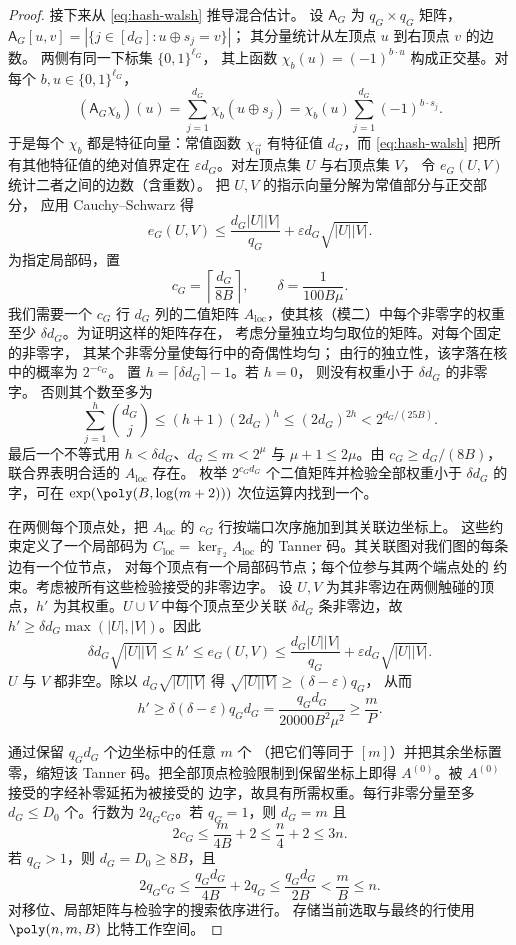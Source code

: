 \begin{proof}
接下来从 \eqref{eq:hash-walsh} 推导混合估计。
设 $\mathsf A_G$ 为 $q_G\times q_G$ 矩阵，
$\mathsf A_G[u,v]=|\{j\in[d_G]:u\oplus s_j=v\}|$；
其分量统计从左顶点 $u$ 到右顶点 $v$ 的边数。
两侧有同一下标集 $\{0,1\}^{\ell_G}$，
其上函数 $\chi_b(u)=(-1)^{b\cdot u}$
构成正交基。对每个 $b,u\in\{0,1\}^{\ell_G}$，
\[
 (\mathsf A_G\chi_b)(u)
 =\sum_{j=1}^{d_G}\chi_b(u\oplus s_j)
 =\chi_b(u)\sum_{j=1}^{d_G}(-1)^{b\cdot s_j}.
\]
于是每个 $\chi_b$ 都是特征向量：常值函数
$\chi_{\vec{0}}$ 有特征值 $d_G$，而
\eqref{eq:hash-walsh} 把所有其他特征值的绝对值界定在
$\varepsilon d_G$。对左顶点集 $U$ 与右顶点集 $V$，
令 $e_G(U,V)$ 统计二者之间的边数（含重数）。
把 $U,V$ 的指示向量分解为常值部分与正交部分，
应用 Cauchy--Schwarz 得
\begin{equation}\label{eq:hash-mixing}
 e_G(U,V)\le
 \frac{d_G|U||V|}{q_G}
 +\varepsilon d_G\sqrt{|U||V|}.
\end{equation}
为指定局部码，置
\[
 c_G=\left\lceil\frac{d_G}{8B}\right\rceil,
 \qquad \delta=\frac1{100B\mu}.
\]
我们需要一个 $c_G$ 行 $d_G$ 列的二值矩阵
$A_{\mathrm{loc}}$，使其核（模二）中每个非零字的权重
至少 $\delta d_G$。为证明这样的矩阵存在，
考虑分量独立均匀取位的矩阵。对每个固定的非零字，
其某个非零分量使每行中的奇偶性均匀；
由行的独立性，该字落在核中的概率为 $2^{-c_G}$。
置 $h=\lceil\delta d_G\rceil-1$。若 $h=0$，
则没有权重小于 $\delta d_G$ 的非零字。
否则其个数至多为
\[
 \sum_{j=1}^{h}\binom{d_G}{j}
 \le(h+1)(2d_G)^h
 \le(2d_G)^{2h}
 <2^{d_G/(25B)}.
\]
最后一个不等式用 $h<\delta d_G$、$d_G\le m<2^\mu$
与 $\mu+1\le2\mu$。由 $c_G\ge d_G/(8B)$，
联合界表明合适的 $A_{\mathrm{loc}}$ 存在。
枚举 $2^{c_Gd_G}$ 个二值矩阵并检验全部权重小于
$\delta d_G$ 的字，可在 $\exp(\poly(B,\log(m+2)))$
次位运算内找到一个。

在两侧每个顶点处，把 $A_{\mathrm{loc}}$ 的 $c_G$
行按端口次序施加到其关联边坐标上。
这些约束定义了一个局部码为
$C_{\mathrm{loc}}=\ker_{\mathbb F_2}A_{\mathrm{loc}}$
的 Tanner 码。其关联图对我们图的每条边有一个位节点，
对每个顶点有一个局部码节点；每个位参与其两个端点处的
约束。考虑被所有这些检验接受的非零边字。
设 $U,V$ 为其非零边在两侧触碰的顶点，$h'$
为其权重。$U\cup V$ 中每个顶点至少关联
$\delta d_G$ 条非零边，故
$h'\ge\delta d_G\max(|U|,|V|)$。因此
\[
 \delta d_G\sqrt{|U||V|}
 \le h'\le e_G(U,V)
 \le\frac{d_G|U||V|}{q_G}
       +\varepsilon d_G\sqrt{|U||V|}.
\]
$U$ 与 $V$ 都非空。除以 $d_G\sqrt{|U||V|}$
得 $\sqrt{|U||V|}\ge(\delta-\varepsilon)q_G$，
从而
\[
 h'\ge\delta(\delta-\varepsilon)q_Gd_G
 =\frac{q_Gd_G}{20000B^2\mu^2}\ge\frac mP.
\]

通过保留 $q_Gd_G$ 个边坐标中的任意 $m$ 个
（把它们等同于 $[m]$）并把其余坐标置零，缩短该
Tanner 码。把全部顶点检验限制到保留坐标上即得
$A^{(0)}$。被 $A^{(0)}$ 接受的字经补零延拓为被接受的
边字，故具有所需权重。每行非零分量至多 $d_G\le D_0$
个。行数为 $2q_Gc_G$。若 $q_G=1$，则 $d_G=m$ 且
\[
 2c_G\le\frac{m}{4B}+2\le\frac n4+2\le3n.
\]
若 $q_G>1$，则 $d_G=D_0\ge8B$，且
\[
 2q_Gc_G\le\frac{q_Gd_G}{4B}+2q_G
 \le\frac{q_Gd_G}{2B}<\frac mB\le n.
\]
对移位、局部矩阵与检验字的搜索依序进行。
存储当前选取与最终的行使用 $\poly(n,m,B)$
比特工作空间。
\end{proof}

